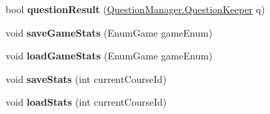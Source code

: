 \begin{DoxyCompactItemize}
\item 
\hypertarget{class_client_a8f1d690090a3889b6cce436e97836f13}{bool {\bfseries question\-Result} (\hyperlink{class_question_manager_1_1_question_keeper}{Question\-Manager.\-Question\-Keeper} q)}\label{class_client_a8f1d690090a3889b6cce436e97836f13}

\item 
\hypertarget{class_client_ad8deea72c07ca461c29404644d0c0841}{void {\bfseries save\-Game\-Stats} (Enum\-Game game\-Enum)}\label{class_client_ad8deea72c07ca461c29404644d0c0841}

\item 
\hypertarget{class_client_a1c7e3e0723cc482504c57eb62e9b6dc1}{void {\bfseries load\-Game\-Stats} (Enum\-Game game\-Enum)}\label{class_client_a1c7e3e0723cc482504c57eb62e9b6dc1}

\item 
\hypertarget{class_client_aa80ad6ef18116f5f47b55d43f074d057}{void {\bfseries save\-Stats} (int current\-Course\-Id)}\label{class_client_aa80ad6ef18116f5f47b55d43f074d057}

\item 
\hypertarget{class_client_a0b0a635d46caf0265f8e674027613912}{void {\bfseries load\-Stats} (int current\-Course\-Id)}\label{class_client_a0b0a635d46caf0265f8e674027613912}

\end{DoxyCompactItemize}
